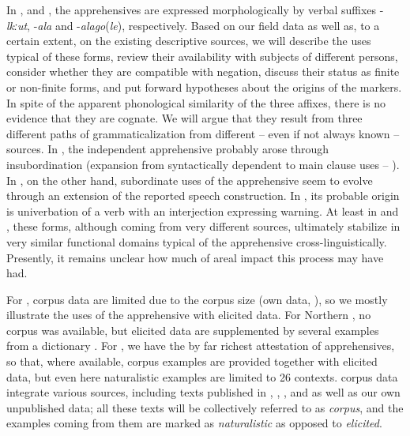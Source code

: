 \documentclass[output=paper,colorlinks,citecolor=brown]{langscibook}
\begin{document}
In ,  and , the apprehensives are expressed morphologically by verbal suffixes \nobreakdash-\textit{lkːut}, \nobreakdash-\textit{ala} and \nobreakdash-\textit{alago}(\textit{le}), respectively. Based on our field data as well as, to a certain extent, on the existing descriptive sources, we will describe the uses typical of these forms, review their availability with subjects of different persons, consider whether they are compatible with negation, discuss their status as finite or non-finite forms, and put forward hypotheses about the origins of the markers. In spite of the apparent phonological similarity of the three affixes, there is no evidence that they are cognate. We will argue that they result from three different paths of grammaticalization from different -- even if not always known -- sources. In , the independent apprehensive probably arose through insubordination (expansion from syntactically dependent to main clause uses -- \citealt{evans2007insubordination}). In , on the other hand, subordinate uses of the apprehensive seem to evolve through an extension of the reported speech construction. In , its probable origin is univerbation of a verb with an interjection expressing warning. At least in  and , these forms, although coming from very different sources, ultimately stabilize in very similar functional domains typical of the apprehensive cross-linguistically. Presently, it remains unclear how much of areal impact this process may have had.

For , corpus data are limited due to the corpus size (own data, \citealt{Magometov1982}), so we mostly illustrate the uses of the apprehensive with elicited data. For Northern , no corpus was available, but elicited data are supplemented by several examples from a dictionary \citep{MagomedovaAbdulaeva2007}. For , we have the by far richest attestation of apprehensives, so that, where available, corpus examples are provided together with elicited data, but even here naturalistic examples are limited to 26 contexts.  corpus data integrate various sources, including texts published in \citet{Dirr1908}, \citet{Mikailov1967}, \citet{Kibrik1977}, and \citet{SamedovMagdilova2017a, SamedovMagdilova2017b} as well as our own unpublished data; all these texts will be collectively referred to as \textit{corpus}, and the examples coming from them are marked as \textit{naturalistic} as opposed to \textit{elicited}.
\end{document}
